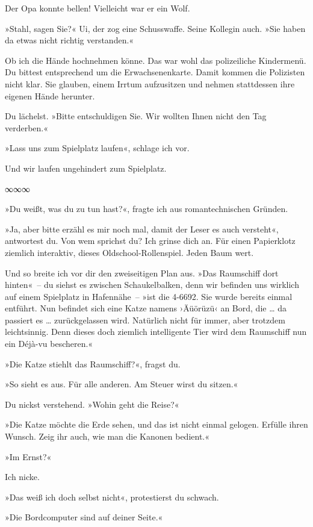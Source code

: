 Der Opa konnte bellen! Vielleicht war er ein Wolf.

»Stahl, sagen Sie?« Ui, der zog eine Schusswaffe. Seine Kollegin auch. »Sie haben da etwas nicht richtig verstanden.«

Ob ich die Hände hochnehmen könne. Das war wohl das polizeiliche Kindermenü. Du bittest entsprechend um die Erwachsenenkarte. Damit kommen die Polizisten nicht klar. Sie glauben, einem Irrtum aufzusitzen und nehmen stattdessen ihre eigenen Hände herunter.

Du lächelst. »Bitte entschuldigen Sie. Wir wollten Ihnen nicht den Tag verderben.«

»Lass uns zum Spielplatz laufen«, schlage ich vor.

Und wir laufen ungehindert zum Spielplatz.

\begin{center}
∞∞∞
\end{center}

»Du weißt, was du zu tun hast?«, fragte ich aus romantechnischen Gründen.

»Ja, aber bitte erzähl es mir noch mal, damit der Leser es auch versteht«, antwortest du. Von wem sprichst du? Ich grinse dich an. Für einen Papierklotz ziemlich interaktiv, dieses Oldschool-Rollenspiel. Jeden Baum wert.

Und so breite ich vor dir den zweiseitigen Plan aus. »Das Raumschiff dort hinten«~– du siehst es zwischen Schaukelbalken, denn wir befinden uns wirklich auf einem Spielplatz in Hafennähe~– »ist die 4-6692. Sie wurde bereits einmal entführt. Nun befindet sich eine Katze namens ›Äüörüzü‹ an Bord, die … da passiert es … zurückgelassen wird. Natürlich nicht für immer, aber trotzdem leichtsinnig. Denn dieses doch ziemlich intelligente Tier wird dem Raumschiff nun ein Déjà-vu bescheren.«

»Die Katze stiehlt das Raumschiff?«, fragst du.

»So sieht es aus. Für alle anderen. Am Steuer wirst du sitzen.«

Du nickst verstehend. »Wohin geht die Reise?«

»Die Katze möchte die Erde sehen, und das ist nicht einmal gelogen. Erfülle ihren Wunsch. Zeig ihr auch, wie man die Kanonen bedient.«

»Im Ernst?«

Ich nicke.

»Das weiß ich doch selbst nicht«, protestierst du schwach.

»Die Bordcomputer sind auf deiner Seite.«

